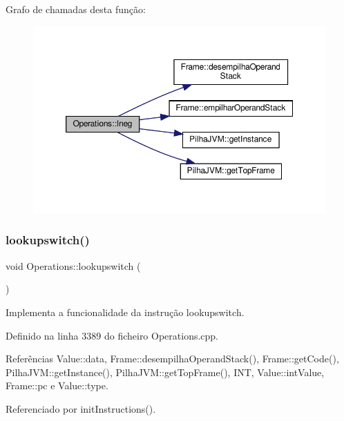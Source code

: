 Grafo de chamadas desta função\+:
\nopagebreak
\begin{figure}[H]
\begin{center}
\leavevmode
\includegraphics[width=350pt]{classOperations_a0a14cc7ee880b5d5f1c3b532e8e2117c_cgraph}
\end{center}
\end{figure}
\mbox{\label{classOperations_a0458ee466daff63a3698973c89cfe71a}} 
\subsubsection{\texorpdfstring{lookupswitch()}{lookupswitch()}}
{\footnotesize\ttfamily void Operations\+::lookupswitch (\begin{DoxyParamCaption}{ }\end{DoxyParamCaption})\hspace{0.3cm}{\ttfamily [private]}}



Implementa a funcionalidade da instrução lookupswitch. 



Definido na linha 3389 do ficheiro Operations.\+cpp.



Referências Value\+::data, Frame\+::desempilha\+Operand\+Stack(), Frame\+::get\+Code(), Pilha\+J\+V\+M\+::get\+Instance(), Pilha\+J\+V\+M\+::get\+Top\+Frame(), I\+NT, Value\+::int\+Value, Frame\+::pc e Value\+::type.



Referenciado por init\+Instructions().

